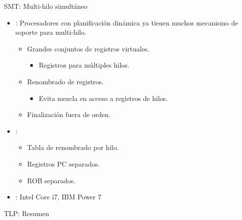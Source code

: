 \begin{frame}[t]{SMT: Multi-hilo simultáneo}
\begin{itemize}
  \item {}: Procesadores con planificación dinámica 
        ya tienen muchos mecanismo de soporte para multi-hilo.
    \begin{itemize}
      \item Grandes conjuntos de registros virtuales.
        \begin{itemize}
          \item Registros para múltiples hilos.
        \end{itemize}
      \item Renombrado de registros.
        \begin{itemize}
          \item Evita mezcla en acceso a registros de hilos.
        \end{itemize}
      \item Finalización fuera de orden.
    \end{itemize}

  \item {}:
    \begin{itemize}
      \item Tabla de renombrado por hilo.
      \item Registros PC separados.
      \item ROB separados.
    \end{itemize}

  \item {}: Intel Core i7, IBM Power 7

\end{itemize}
\end{frame}

\begin{frame}[t]{TLP: Resumen}
\makebox[\textwidth][c]{

}
\end{frame}
